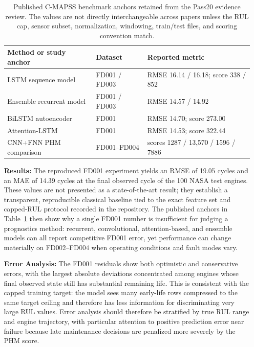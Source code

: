 \begin{table}[t]
\centering
\small
\caption{Published C-MAPSS benchmark anchors retained from the Pass20 evidence review. The values are not directly interchangeable across papers unless the RUL cap, sensor subset, normalization, windowing, train/test files, and scoring convention match.}
\label{tab:ch1-cmapss-benchmark}
\begin{tabular}{lll}
\toprule
Method or study anchor & Dataset & Reported metric \\
\midrule
LSTM sequence model & FD001 / FD003 & RMSE 16.14 / 16.18; score 338 / 852 \\
Ensemble recurrent model & FD001 / FD003 & RMSE 14.57 / 14.92 \\
BiLSTM autoencoder & FD001 & RMSE 14.70; score 273.00 \\
Attention-LSTM & FD001 & RMSE 14.53; score 322.44 \\
CNN+FNN PHM comparison & FD001--FD004 & scores 1287 / 13,570 / 1596 / 7886 \\
\bottomrule
\end{tabular}
\end{table}

\textbf{Results:} The reproduced FD001 experiment yields an RMSE of 19.05 cycles and an MAE of 14.39 cycles at the final observed cycle of the 100 NASA test engines. These values are not presented as a state-of-the-art result; they establish a transparent, reproducible classical baseline tied to the exact feature set and capped-RUL protocol recorded in the repository. The published anchors in Table~\ref{tab:ch1-cmapss-benchmark} then show why a single FD001 number is insufficient for judging a prognostics method: recurrent, convolutional, attention-based, and ensemble models can all report competitive FD001 error, yet performance can change materially on FD002--FD004 when operating conditions and fault modes vary.

\textbf{Error Analysis:} The FD001 residuals show both optimistic and conservative errors, with the largest absolute deviations concentrated among engines whose final observed state still has substantial remaining life. This is consistent with the capped training target: the model sees many early-life rows compressed to the same target ceiling and therefore has less information for discriminating very large RUL values. Error analysis should therefore be stratified by true RUL range and engine trajectory, with particular attention to positive prediction error near failure because late maintenance decisions are penalized more severely by the PHM score.


